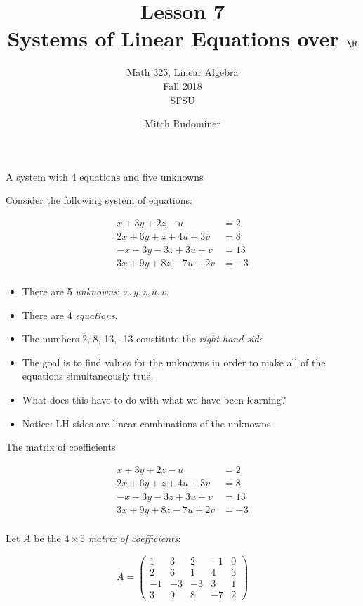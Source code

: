 \documentclass{beamer}
\title{Lesson 7 \\ Systems of Linear Equations over $\R$}
\subtitle{Math 325, Linear Algebra \\ Fall 2018 \\ SFSU}
\author{Mitch Rudominer}
\date{}
\begin{document}
\begin{frame}
  \titlepage
\end{frame}

\begin{frame}{A system with 4 equations and five unknowns}

Consider the following system of equations:

\begin{align*}
 x + 3y + 2z - u  \qquad &= 2 \\
2x + 6y + z + 4u + 3v  &= 8 \\
-x -3y  -3z + 3u + v  &= 13 \\
3x + 9y + 8z  -7u + 2v  &= -3 \\
\end{align*}

\begin{itemize}
\item There are 5 \emph{unknowns}: $x, y, z, u, v$.
\item There are 4 \emph{equations}.
\item The numbers 2, 8, 13, -13 constitute the \emph{right-hand-side}
\item The goal is to find values for the unknowns in order to make all of the
equations simultaneously true.
\item What does this have to do with what we have been learning?
\item Notice: LH sides are linear combinations of the unknowns.
\end{itemize}

\end{frame}


\begin{frame}{The matrix of coefficients}

\begin{align*}
 x + 3y + 2z - u  \qquad &= 2 \\
2x + 6y + z + 4u + 3v  &= 8 \\
-x -3y  -3z + 3u + v  &= 13 \\
3x + 9y + 8z  -7u + 2v  &= -3 \\
\end{align*}

Let $A$ be the $4 \times 5$ \emph{matrix of coefficients}:

$$
A =
\begin{pmatrix}
1 & 3 & 2 & -1 & 0 \\
2 & 6 & 1 & 4 & 3\\
-1 & -3 & -3 & 3 & 1 \\
3 & 9 & 8 & -7 & 2
\end{pmatrix}
$$

\end{frame}
\end{document}

